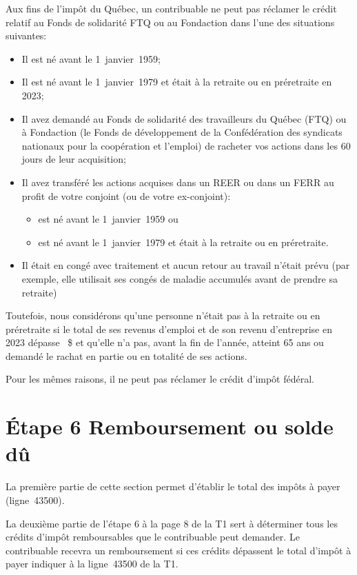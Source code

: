 Aux fins de l'impôt du Québec, un contribuable ne peut pas réclamer le crédit relatif au Fonds de solidarité FTQ ou au Fondaction dans l'une des situations suivantes:
\begin{itemize}
	\item Il est né avant le 1\ier{}~janvier~1959;
	\item Il est né avant le 1\ier{}~janvier~1979 et était à la retraite ou en préretraite en 2023;
	\item Il avez demandé au Fonds de solidarité des travailleurs du Québec (FTQ) ou à Fondaction (le Fonds de développement de la Confédération des syndicats nationaux pour la coopération et l'emploi) de racheter vos actions dans les 60 jours de leur acquisition;
	\item Il avez transféré les actions acquises dans un REER ou dans un FERR au profit de votre conjoint (ou de votre ex-conjoint):
	\begin{itemize}
		\item est né avant le 1\ier{}~janvier~1959 ou
		\item est né avant le 1\ier{}~janvier~1979 et était à la retraite ou en préretraite.
	\end{itemize}
	\item Il était en congé avec traitement et aucun retour au travail n'était prévu (par exemple, elle utilisait ses congés de maladie accumulés avant de prendre sa retraite)
\end{itemize}

Toutefois, nous considérons qu'une personne n'était pas à la retraite ou en préretraite si le total de ses revenus d'emploi et de son revenu d'entreprise en 2023 dépasse ~\$ et qu'elle n'a pas, avant la fin de l'année, atteint 65 ans ou demandé le rachat en partie ou en totalité de ses actions.

Pour les mêmes raisons, il ne peut pas réclamer le crédit d'impôt fédéral. 



\section{Étape 6 \og Remboursement ou solde dû \fg{}}
La première partie de cette section permet d'établir le total des impôts à payer (ligne~43500).

La deuxième partie de l'étape 6 à la page 8 de la T1 sert à déterminer tous les crédits d'impôt remboursables que le contribuable peut demander. Le contribuable recevra un remboursement si ces crédits dépassent le total d'impôt à payer indiquer à la ligne~43500 de la T1.

